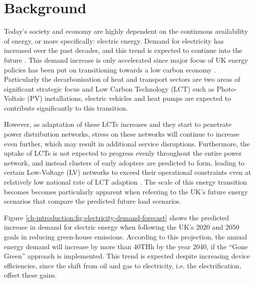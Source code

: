 \section{Background}
\label{ch-introduction:sec:background}


Today's society and economy are highly dependent on the continuous availability of energy, or more specifically: electric energy.
Demand for electricity has increased over the past decades, and this trend is expected to continue into the future \cite{HMGovernment2009}.
This demand increase is only accelerated since major focus of UK energy policies has been put on transitioning towards a low carbon economy \cite{RoyalAcademyofEngineering2010}.
Particularly the decarbonisation of heat and transport sectors are two areas of significant strategic focus and Low Carbon Technology (LCT) such as Photo-Voltaic (PV) installations, electric vehicles and heat pumps are expected to contribute significantly to this transition.

However, as adaptation of these LCTs increases and they start to penetrate power distribution networks, stress on these networks will continue to increase even further, which may result in additional service disruptions.
Furthermore, the uptake of LCTs is not expected to progress evenly throughout the entire power network, and instead clusters of early adopters are predicted to form, leading to certain Low-Voltage (LV) networks to exceed their operational constraints even at relatively low national rate of LCT adaption \cite{Poghosyan2014}.
The scale of this energy transition becomes becomes particularly apparent when referring to the UK's future energy scenarios that compare the predicted future load scenarios.



Figure \ref{ch-introduction:fig:electricity-demand-forecast} shows the predicted increase in demand for electric energy when following the UK's 2020 and 2050 goals in reducing green-house emissions.
According to this projection, the annual energy demand will increase by more than 40THh by the year 2040, if the ``Gone Green'' approach is implemented.
This trend is expected despite increasing device efficiencies, since the shift from oil and gas to electricity, i.e. the electrification, offset these gains.



